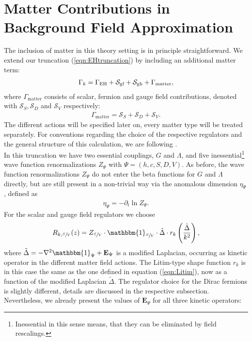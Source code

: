 \section{Matter Contributions in Background Field Approximation}
The inclusion of matter in this theory setting is in principle straightforward. We extend our truncation (\ref{eqn:EHtruncation}) by including an additional matter term: 
\begin{align}
	\Gamma_{k} = \Gamma_{\text{EH}} + \mathcal{S}_{\text{gf}}+ \mathcal{S}_{\text{gh}}+ \Gamma_{\text{matter}},
\end{align}
where $\Gamma_{\mathrm{matter}}$ consists of scalar, fermion and gauge field contributions, denoted with $\mathcal{S}_S, \mathcal{S}_D$ and $\mathcal{S}_V$ respectively:
\begin{align}
	\Gamma_{\text{matter}} = \mathcal{S}_S + \mathcal{S}_D + \mathcal{S}_V.
\end{align}
The different actions will be specified later on, every matter type will be treated separately. For conventions regarding the choice of the respective regulators and the general structure of this calculation, we are following \cite{DonaEichhornPercacci2013}. \\
In this truncation we have two essential couplings, $G$ and $\Lambda$, and five inessential\footnote{Inessential in this sense means, that they can be eliminated by field rescalings.} wave function renormalizations $Z_{\Psi}$ with $\Psi = (h,c,S,D,V)$. As before, the wave function renormalizations $Z_{\Psi}$ do not enter the beta functions for $G$ and $\Lambda$ directly, but are still present in a non-trivial way via the anomalous dimension $\eta_{\Psi}$, defined as
\begin{align}
	\eta_{\Psi} = -\partial_t \ln Z_{\Psi}.
\end{align}
For the scalar and gauge field regulators we choose
\begin{align}
	R_{k,\sfrac{S}{V}}(z) = Z_{\sfrac{S}{V}} \cdot \mathbbm{1}_{\sfrac{S}{V}} \cdot \tilde{\Delta}\cdot r_k\left(\frac{\tilde{\Delta}}{k^2}\right),
	\label{eqn:Rk_matter}
\end{align}
where $\tilde{\Delta}= -\nabla^2\mathbbm{1}_{\Psi} + \mathbf{E}_{\Psi}$ is a modified Laplacian, occurring as kinetic operator in the different matter field actions. The Litim-type shape function $r_k$ is in this case the same as the one defined in equation (\ref{eqn:Litim}), now as a function of the modified Laplacian $\tilde{\Delta}$. The regulator choice for the Dirac fermions is slightly different, details are discussed in the respective subsection. Nevertheless, we already present the values of $\mathbf{E}_{\Psi}$ for all three kinetic operators:
